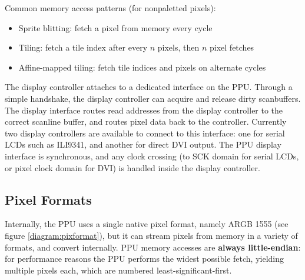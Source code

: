Common memory access patterns (for nonpaletted pixels):

\begin{itemize}
	\item Sprite blitting: fetch a pixel from memory every cycle
	\item Tiling: fetch a tile index after every $n$ pixels, then $n$ pixel fetches
	\item Affine-mapped tiling: fetch tile indices and pixels on alternate cycles
\end{itemize}

The display controller attaches to a dedicated interface on the PPU. Through a simple handshake, the display controller can acquire and release dirty scanbuffers. The display interface routes read addresses from the display controller to the correct scanline buffer, and routes pixel data back to the controller. Currently two display controllers are available to connect to this interface: one for serial LCDs such as ILI9341, and another for direct DVI output. The PPU display interface is synchronous, and any clock crossing (to SCK domain for serial LCDs, or pixel clock domain for DVI) is handled inside the display controller.

\subsection{Pixel Formats}

Internally, the PPU uses a single native pixel format, namely ARGB 1555 (see figure \ref{diagram:pixformat}), but it can stream pixels from memory in a variety of formats, and convert internally. PPU memory accesses are \textbf{always little-endian}: for performance reasons the PPU performs the widest possible fetch, yielding multiple pixels each, which are numbered least-significant-first.

